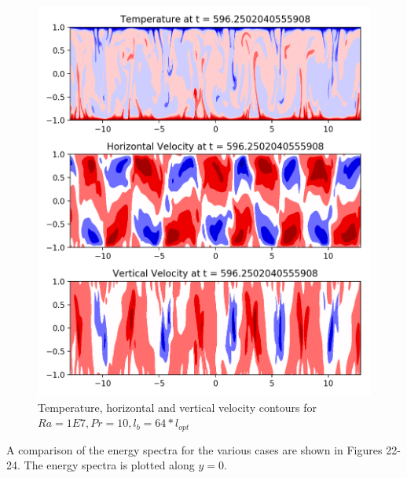 \documentclass[12pt]{article}
\begin{document}
        \begin{figure}[!htb]
        	\includegraphics[width=\linewidth]{contours_1E7_10_64.png}
        	\caption{Temperature, horizontal and vertical velocity contours for $Ra = 1E7, Pr =10, l_b = 64* l_{opt} $ }
        	\label{fig:fig21}
        \end{figure}
     
     A comparison of the energy spectra for the various cases are shown in Figures 22-24. The energy spectra is plotted along $y = 0$. 
     
\end{document}

